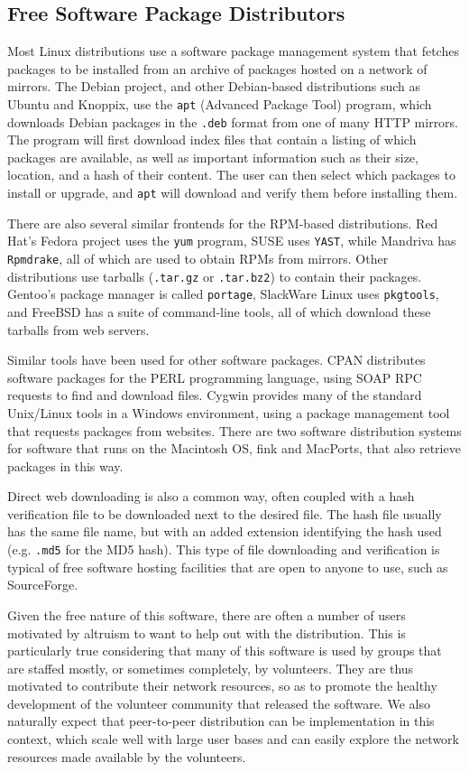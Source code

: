 \documentclass[conference]{IEEEtran}
\begin{document}
\subsection{Free Software Package Distributors}
\label{examples}

Most Linux distributions use a software package management system
that fetches packages to be installed from an archive of packages
hosted on a network of mirrors. The Debian project, and other
Debian-based distributions such as Ubuntu and Knoppix, use the
\texttt{apt} (Advanced Package Tool) program, which downloads Debian
packages in the \texttt{.deb} format from one of many HTTP mirrors.
The program will first download index files that contain a listing
of which packages are available, as well as important information
such as their size, location, and a hash of their content. The user
can then select which packages to install or upgrade, and
\texttt{apt} will download and verify them before installing them.

There are also several similar frontends for the RPM-based
distributions. Red Hat's Fedora project uses the \texttt{yum}
program, SUSE uses \texttt{YAST}, while Mandriva has
\texttt{Rpmdrake}, all of which are used to obtain RPMs from
mirrors. Other distributions use tarballs (\texttt{.tar.gz} or
\texttt{.tar.bz2}) to contain their packages. Gentoo's package
manager is called \texttt{portage}, SlackWare Linux uses
\texttt{pkgtools}, and FreeBSD has a suite of command-line tools,
all of which download these tarballs from web servers.

Similar tools have been used for other software packages. CPAN
distributes software packages for the PERL
programming language, using SOAP RPC requests to find and download
files. Cygwin provides many of the
standard Unix/Linux tools in a Windows environment, using a
package management tool that requests packages from websites. There
are two software distribution systems for software that runs on the Macintosh OS, fink and
MacPorts, that also retrieve packages in this way.

Direct web downloading is also a common way, often coupled with a hash
verification file to be downloaded next to the desired
file. The hash file usually has the same file name, but with an
added extension identifying the hash used (e.g. \texttt{.md5} for
the MD5 hash). This type of file downloading and verification is
typical of free software hosting facilities that are open to anyone
to use, such as SourceForge.


Given the free nature of this software, there are often a number of users
motivated by altruism to want to help out with the distribution.
This is particularly true considering that many of this software is used by
groups that are staffed mostly, or sometimes completely, by
volunteers. They are thus motivated to contribute their network resources, so as to promote the healthy development
of the volunteer community that released the software.
We also naturally expect that peer-to-peer distribution can be implementation in
this context, which scale well with large user bases and can easily explore the network resources made available by
the volunteers.
\end{document}
